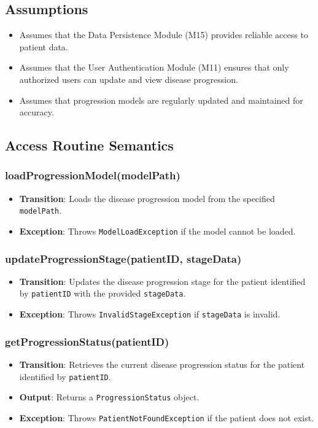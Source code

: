 \documentclass[12pt, titlepage]{article}
\begin{document}
\subsection{Assumptions}
\begin{itemize}
    \item Assumes that the Data Persistence Module (M15) provides reliable access to patient data.
    \item Assumes that the User Authentication Module (M11) ensures that only authorized users can update and view disease progression.
    \item Assumes that progression models are regularly updated and maintained for accuracy.
\end{itemize}

\subsection{Access Routine Semantics}

\subsubsection{loadProgressionModel(modelPath)}
\begin{itemize}
    \item \textbf{Transition}: Loads the disease progression model from the specified \texttt{modelPath}.
    \item \textbf{Exception}: Throws \texttt{ModelLoadException} if the model cannot be loaded.
\end{itemize}

\subsubsection{updateProgressionStage(patientID, stageData)}
\begin{itemize}
    \item \textbf{Transition}: Updates the disease progression stage for the patient identified by \texttt{patientID} with the provided \texttt{stageData}.
    \item \textbf{Exception}: Throws \texttt{InvalidStageException} if \texttt{stageData} is invalid.
\end{itemize}

\subsubsection{getProgressionStatus(patientID)}
\begin{itemize}
    \item \textbf{Transition}: Retrieves the current disease progression status for the patient identified by \texttt{patientID}.
    \item \textbf{Output}: Returns a \texttt{ProgressionStatus} object.
    \item \textbf{Exception}: Throws \texttt{PatientNotFoundException} if the patient does not exist.
\end{itemize}
\end{document}
